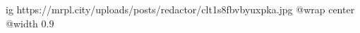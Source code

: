  
 
 
 
 

\ifcmt
  ig https://mrpl.city/uploads/posts/redactor/clt1s8fbvbyuxpka.jpg
  @wrap center
  @width 0.9
\fi
